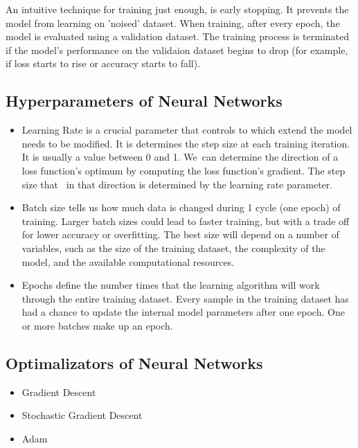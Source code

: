 An intuitive technique for training just enough, is early stopping. It prevents the model from learning on 'noised' dataset. When training, after every epoch, the model is evaluated using a validation dataset. The training process is terminated if the model's performance on the validaion dataset begins to drop (for example, if loss starts to rise or accuracy starts to fall).



\subsection*{Hyperparameters of Neural Networks}
\begin{itemize}
	\item Learning Rate is a crucial parameter that controls to which extend the model needs to be modified. It is determines the step size at each training iteration. It is usually a value between 0 and 1. We can determine the direction of a loss function's optimum by computing the loss function's gradient. The step size that  in that direction is determined by the learning rate parameter.
	\item Batch size tells us how much data is changed during 1 cycle (one epoch) of training. Larger batch sizes could lead to faster training, but with a trade off for lower accuracy or overfitting. The best size will depend on a number of variables, such as the size of the training dataset, the complexity of the model, and the available computational resources.
	\item Epochs define the number times that the learning algorithm will work through the entire training dataset. Every sample in the training dataset has had a chance to update the internal model parameters after one epoch. One or more batches make up an epoch.
\end{itemize}



\subsection*{Optimalizators of Neural Networks}
\begin{itemize}
	\item Gradient Descent
	\item Stochastic Gradient Descent
	\item Adam
\end{itemize}





